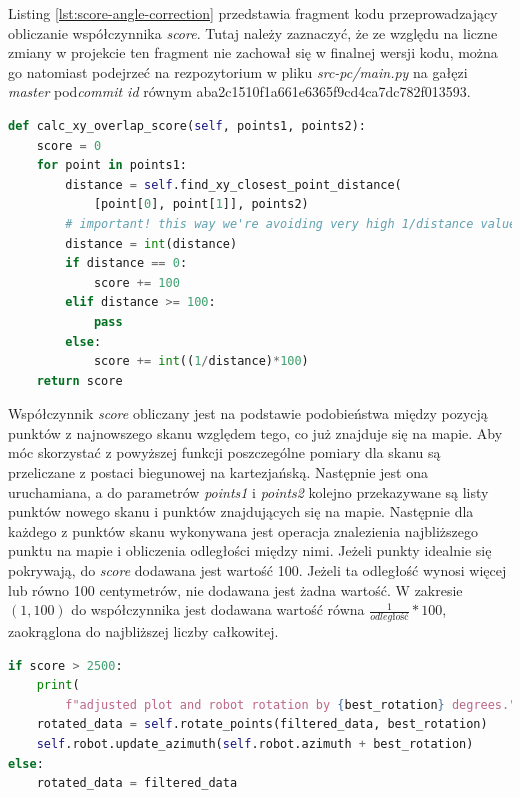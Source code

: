 Listing \ref{lst:score-angle-correction} przedstawia fragment kodu przeprowadzający obliczanie współczynnika \emph{score}. Tutaj należy zaznaczyć, że ze względu na liczne zmiany w projekcie ten fragment nie zachował się w finalnej wersji kodu, można go natomiast podejrzeć na rezpozytorium w pliku \emph{src-pc/main.py} na gałęzi \emph{master} pod\emph{commit id} równym aba2c1510f1a661e6365f9cd4ca7dc782f013593.

\begin{lstlisting}[basicstyle=\footnotesize\ttfamily,language=python,caption=Obliczanie współczynnika \emph{score} i korekcja kąta w celu dopasowania pomiaru do mapy,label=lst:score-angle-correction]
def calc_xy_overlap_score(self, points1, points2):
    score = 0
    for point in points1:
        distance = self.find_xy_closest_point_distance(
            [point[0], point[1]], points2)
        # important! this way we're avoiding very high 1/distance value
        distance = int(distance)
        if distance == 0:
            score += 100
        elif distance >= 100:
            pass
        else:
            score += int((1/distance)*100)
    return score
\end{lstlisting}

Współczynnik \emph{score} obliczany jest na podstawie podobieństwa między pozycją punktów z najnowszego skanu względem tego, co już znajduje się na mapie. Aby móc skorzystać z powyższej funkcji poszczególne pomiary dla skanu są przeliczane z postaci biegunowej na kartezjańską. Następnie jest ona uruchamiana, a do parametrów \emph{points1} i \emph{points2} kolejno przekazywane są listy punktów nowego skanu i punktów znajdujących się na mapie. Następnie dla każdego z punktów skanu wykonywana jest operacja znalezienia najbliższego punktu na mapie i obliczenia odległości między nimi. Jeżeli punkty idealnie się pokrywają, do \emph{score} dodawana jest wartość 100. Jeżeli ta odległość wynosi więcej lub równo 100 centymetrów, nie dodawana jest żadna wartość. W zakresie $(1,100)$ do współczynnika jest dodawana wartość równa $\frac{1}{odległość}*100$, zaokrąglona do najbliższej liczby całkowitej. 

\begin{lstlisting}[basicstyle=\footnotesize\ttfamily,language=python,caption=Decyzja o zastosowaniu korekty,label=lst:score-threshold]
if score > 2500:
    print(
        f"adjusted plot and robot rotation by {best_rotation} degrees.")
    rotated_data = self.rotate_points(filtered_data, best_rotation)
    self.robot.update_azimuth(self.robot.azimuth + best_rotation)
else:
    rotated_data = filtered_data
\end{lstlisting}

